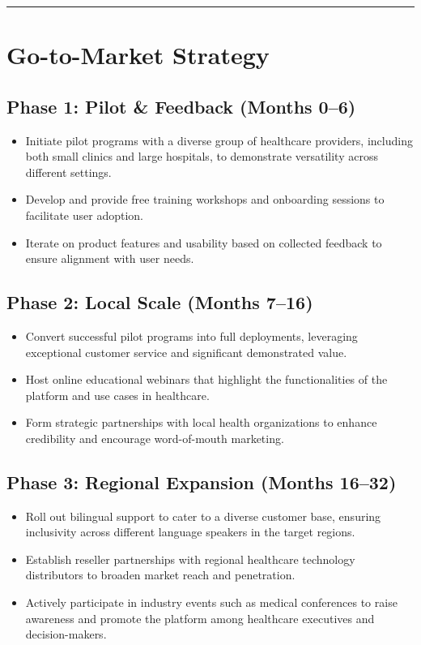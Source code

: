 \documentclass[11pt,a4paper]{article}
\begin{document}
\bigskip\hrule\bigskip

\section{Go-to-Market Strategy}

\subsection{Phase 1: Pilot \& Feedback (Months 0--6)}
\begin{itemize}
  \item Initiate pilot programs with a diverse group of healthcare providers, including both small clinics and large hospitals, to demonstrate versatility across different settings.
  \item Develop and provide free training workshops and onboarding sessions to facilitate user adoption.
  \item Iterate on product features and usability based on collected feedback to ensure alignment with user needs.
\end{itemize}

\subsection{Phase 2: Local Scale (Months 7--16)}
\begin{itemize}
  \item Convert successful pilot programs into full deployments, leveraging exceptional customer service and significant demonstrated value.
  \item Host online educational webinars that highlight the functionalities of the platform and use cases in healthcare.
  \item Form strategic partnerships with local health organizations to enhance credibility and encourage word-of-mouth marketing.
\end{itemize}

\subsection{Phase 3: Regional Expansion (Months 16--32)}
\begin{itemize}
  \item Roll out bilingual support to cater to a diverse customer base, ensuring inclusivity across different language speakers in the target regions.
  \item Establish reseller partnerships with regional healthcare technology distributors to broaden market reach and penetration.
  \item Actively participate in industry events such as medical conferences to raise awareness and promote the platform among healthcare executives and decision-makers.
\end{itemize}
\end{document}
